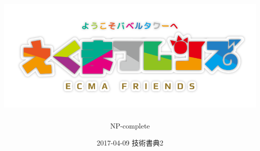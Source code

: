 \title{\includegraphics[width=\textwidth,height=\textheight,keepaspectratio]{./images/logo.png}}
\author{NP-complete}
\date{2017-04-09 技術書典2}
\Huge
\maketitle
\normalsize
